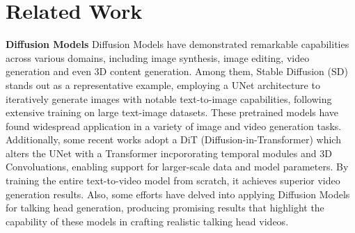\documentclass[runningheads]{llncs}
\begin{document}


\section{Related Work}
\textbf{Diffusion Models}
Diffusion Models have demonstrated remarkable capabilities across various domains, including image synthesis\cite{DiffusionBeatGAN,ddpm}, image editing\cite{imageedit-imagic, dragdiffusion}, video generation\cite{animatediff, animate_anyone} and even 3D  content generation\cite{dreamfusion, magic3d}. Among them, Stable Diffusion (SD)\cite{ldm} stands out as a representative example, employing a UNet architecture to iteratively generate images with notable text-to-image capabilities, following extensive training on large text-image datasets\cite{laion5b}. 
These pretrained models have found widespread application in a variety of image and video generation tasks\cite{animate_anyone,animatediff}. 
Additionally, some recent works adopt a DiT (Diffusion-in-Transformer)\cite{DiT} which alters the UNet with a Transformer incpororating temporal modules and 3D Convoluations, enabling support for larger-scale data and model parameters. By training the entire text-to-video model from scratch, it achieves superior video generation results\cite{latte}. Also, some efforts have delved into applying Diffusion Models for talking head generation, producing promising results that highlight the capability of these models in crafting realistic talking head videos\cite{diffused_head,dreamtalk}. 
\end{document}
